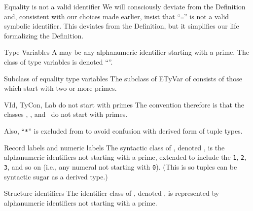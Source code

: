 \begin{deviation}{Equality is not a valid identifier}
We will consciously deviate from the Definition and, consistent with our
choices made earlier, insist that ``\texttt{=}'' is not a valid symbolic
identifier. This deviates from the Definition, but it simplifies our
life formalizing the Definition.
\end{deviation}

\begin{definition}{Type Variables}
A  may be any alphanumeric identifier starting
with a prime. The class of type variables is denoted ``{\TyVar}''.
\end{definition}

\begin{definition}{Subclass of equality type variables}
The subclass of  ETyVar of {\TyVar}
consists of those which start with two or more primes.
\end{definition}

\begin{convention}{VId, TyCon, Lab do not start with primes}
The convention therefore is that the classes \VId, \TyCon, and \Lab\ do
not start with primes.

Also, ``\texttt{*}'' is excluded from {\TyCon} to avoid confusion with
derived form of tuple types.
\end{convention}

\begin{definition}{Record labels and numeric labels}\label{defn:record-and-numeric-labels}
The syntactic class of , denoted {\Lab}, is
the alphanumeric identifiers not starting with a prime, extended to
include the  \texttt{1}, \texttt{2}, \texttt{3},
and so on (i.e., any numeral not starting with \texttt{0}).
(This is so tuples can be syntactic sugar as a derived type.)
\end{definition}

\begin{definition}{Structure identifiers}
The identifier class of , denoted \StrId,
is represented by alphanumeric identifiers not starting with a prime.
\end{definition}

